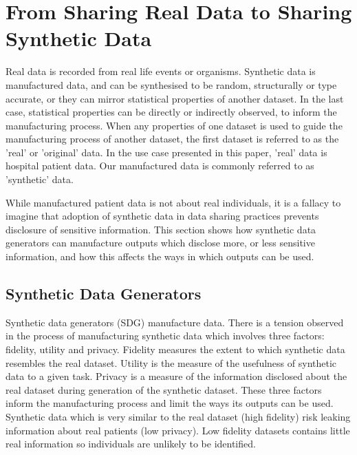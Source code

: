 \documentclass[11pt]{article}
\begin{document}
\section{From Sharing Real Data to Sharing Synthetic Data}
Real data is recorded from real life events or organisms. Synthetic data is manufactured data, and can be synthesised to be random, structurally or type accurate, or they can mirror statistical properties of another dataset. In the last case, statistical properties can be directly or indirectly observed, to inform the manufacturing process. When any properties of one dataset is used to guide the manufacturing process of another dataset, the first dataset is referred to as the 'real' or 'original' data. In the use case presented in this paper, 'real' data is hospital patient data. Our manufactured data is commonly referred to as 'synthetic' data.

While manufactured patient data is not about real individuals, it is a fallacy to imagine that adoption of synthetic data in data sharing practices prevents disclosure of sensitive information. This section shows how synthetic data generators can manufacture outputs which disclose more, or less sensitive information, and how this affects the ways in which outputs can be used.

\subsection{Synthetic Data Generators}


Synthetic data generators (SDG) manufacture data. There is a tension observed in the process of manufacturing synthetic data which involves three factors: fidelity, utility and privacy. Fidelity measures the extent to which synthetic data resembles the real dataset. Utility is the measure of the usefulness of synthetic data to a given task. Privacy is a measure of the information disclosed about the real dataset during generation of the synthetic dataset. These three factors inform the manufacturing process and limit the ways its outputs can be used. Synthetic data which is very similar to the real dataset (high fidelity) risk leaking information about real patients (low privacy). Low fidelity datasets contains little real information so individuals are unlikely to be identified. 
\end{document}

